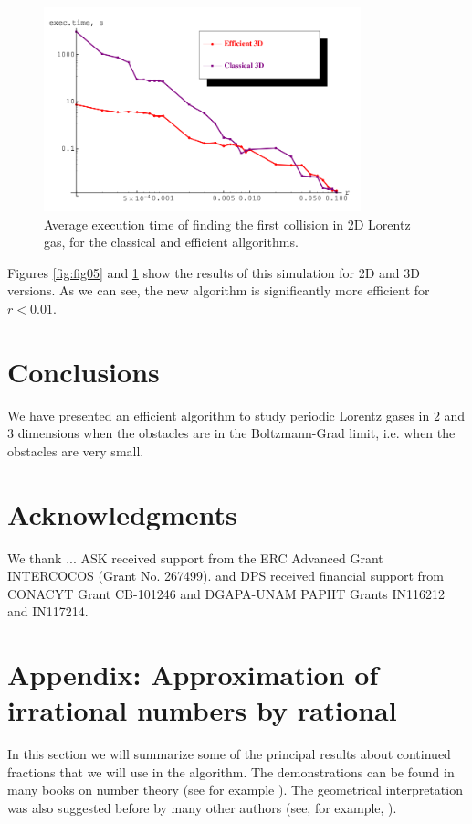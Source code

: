 \documentclass[prl,amsmath,amssymb, twocolumn, showpacs]{revtex4-1}
\begin{document}
\begin{figure}
\centering
\includegraphics [width=260pt]{fig06.png}
\caption{Average execution time of finding the first collision in 2D Lorentz gas, for the classical and efficient allgorithms.}
\label{fig:fig06}
\end{figure}

Figures \ref{fig:fig05} and \ref{fig:fig06} show the results of this simulation for 2D and 3D versions. As we can see, the new algorithm is significantly more efficient for $r < 0.01$.





\section{Conclusions}  

We have presented an efficient algorithm to study periodic Lorentz gases in 2 and 3 dimensions when the obstacles are in the Boltzmann-Grad limit, i.e. when the obstacles are very small. 

\section{Acknowledgments}  
We thank ... ASK received support from the ERC Advanced Grant
INTERCOCOS (Grant No. 267499). and DPS received financial support from CONACYT Grant CB-101246 and DGAPA-UNAM PAPIIT Grants
IN116212 and IN117214.


\section{Appendix: Approximation of irrational numbers by rational}

In this section we will summarize some of the principal results about continued fractions that we will use in the algorithm. The demonstrations can be found in many books on number theory (see for example \cite{niven2008introduction}). The geometrical interpretation was also suggested before by many other authors (see, for example, \cite{nogueira1995three}). 
\end{document}
